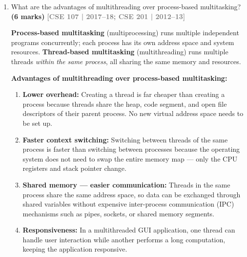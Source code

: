 \documentclass[12pt,a3paper]{article}
\newcommand{\yr}[1]{\hfill\textcolor{gray}{\small\textbf{[#1]}}}
\newcommand{\mk}[1]{\textcolor{orange!70!black}{\small\textbf{(#1 marks)}}}
\begin{document}
\begin{enumerate}
\begin{tcolorbox}
\begin{lstlisting}[language=Java]
        long total = 0;
        for (long p : partial) total += p;
        System.out.println("Sum = " + total); // 50,000,005,000,000
    }
}
\end{lstlisting}

\end{tcolorbox}

\item What are the advantages of multithreading over process-based multitasking? \mk{6}
\yr{CSE 107 | 2017--18; CSE 201 | 2012--13}

\begin{tcolorbox}[enhanced,breakable,ansbox,
  colback=cF!4,colframe=cF,boxrule=0.8pt,arc=5pt,
  title={\textbf{Answer — Multithreading vs.\ Process-Based Multitasking}},
  fonttitle=\bfseries\color{white},colbacktitle=cF]

\textbf{Process-based multitasking} (multiprocessing) runs multiple
independent programs concurrently; each process has its own address
space and system resources.  \textbf{Thread-based multitasking}
(multithreading) runs multiple threads \emph{within the same process},
all sharing the same memory and resources.

\medskip
\textbf{Advantages of multithreading over process-based multitasking:}

\begin{enumerate}[label=\textbf{\arabic*.}]
  \item \textbf{Lower overhead:} Creating a thread is far cheaper than
    creating a process because threads share the heap, code segment,
    and open file descriptors of their parent process.  No new virtual
    address space needs to be set up.

  \item \textbf{Faster context switching:} Switching between threads
    of the same process is faster than switching between processes
    because the operating system does not need to swap the entire
    memory map — only the CPU registers and stack pointer change.

  \item \textbf{Shared memory — easier communication:} Threads in the
    same process share the same address space, so data can be
    exchanged through shared variables without expensive inter-process
    communication (IPC) mechanisms such as pipes, sockets, or shared
    memory segments.

  \item \textbf{Responsiveness:} In a multithreaded GUI application,
    one thread can handle user interaction while another performs a
    long computation, keeping the application responsive.


\end{enumerate}
\end{tcolorbox}
\end{enumerate}
\end{document}
